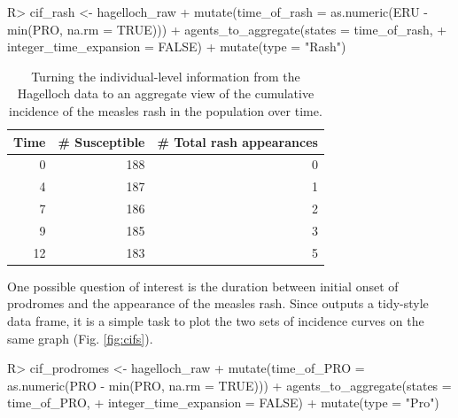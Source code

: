 \documentclass[
  shortnames]{jss}
\begin{document}
\begin{CodeChunk}
\begin{CodeInput}
R> cif_rash  <- hagelloch_raw %
+   mutate(time_of_rash = as.numeric(ERU - min(PRO, na.rm = TRUE))) %
+   agents_to_aggregate(states = time_of_rash,
+                       integer_time_expansion = FALSE) %
+   mutate(type = "Rash")
\end{CodeInput}
\end{CodeChunk}

\begin{CodeChunk}
\begin{table}[!h]

\caption{\label{tab:cif-rash}Turning the individual-level information from the Hagelloch data to an aggregate view of the cumulative incidence of the measles rash in the population over time.}
\centering
\begin{tabular}[t]{rrr}
\toprule
Time & \# Susceptible & \# Total rash appearances\\
\midrule
0 & 188 & 0\\
4 & 187 & 1\\
7 & 186 & 2\\
9 & 185 & 3\\
12 & 183 & 5\\
\bottomrule
\end{tabular}
\end{table}

\end{CodeChunk}

One possible question of interest is the duration between initial onset
of prodromes and the appearance of the measles rash. Since
 outputs a tidy-style data frame, it is a
simple task to plot the two sets of incidence curves on the same graph
(Fig. \ref{fig:cifs}).

\begin{CodeChunk}
\begin{CodeInput}
R> cif_prodromes <- hagelloch_raw %
+   mutate(time_of_PRO = as.numeric(PRO - min(PRO, na.rm = TRUE))) %
+   agents_to_aggregate(states = time_of_PRO,
+                       integer_time_expansion = FALSE) %
+   mutate(type = "Pro")
\end{CodeInput}
\end{CodeChunk}
\end{document}
